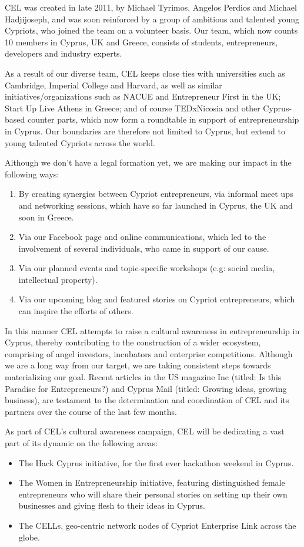 \documentclass[a4paper,11pt]{report}
\begin{document}
CEL was created in late 2011, by Michael Tyrimos, Angelos Perdios and Michael Hadjijoseph, and was soon reinforced by a group of ambitious and talented young Cypriots, who joined the team on a volunteer basis. Our team, which now counts 10 members in Cyprus, UK and Greece, consists of students, entrepreneurs, developers and industry experts. 

As a result of our diverse team, CEL keeps close ties with universities such as Cambridge, Imperial College and Harvard, as well as similar initiatives/organizations such as NACUE and Entrepreneur First in the UK; Start Up Live Athens in Greece; and of course TEDxNicosia and other Cyprus-based counter parts, which now form a roundtable in support of entrepreneurship in Cyprus. Our boundaries are therefore not limited to Cyprus, but extend to young talented Cypriots across the world.

Although we don’t have a legal formation yet, we are making our impact in the following ways:
\begin{enumerate}
  \item By creating synergies between Cypriot entrepreneurs, via informal meet ups and networking sessions, which have so far launched in Cyprus, the UK and soon in Greece. 
  \item Via our Facebook page and online communications, which led to the involvement of several individuals, who came in support of our cause.
  \item Via our planned events and topic-specific workshops (e.g: social media, intellectual property).
  \item Via our upcoming blog and featured stories on Cypriot entrepreneurs, which can inspire the efforts of others. 
\end{enumerate}

In this manner CEL attempts to raise a cultural awareness in entrepreneurship in Cyprus, thereby contributing to the construction of a wider ecosystem, comprising of angel investors, incubators and enterprise competitions. Although we are a long way from our target, we are taking consistent steps towards materializing our goal. Recent articles in the US magazine Inc (titled: Is this Paradise for Entrepreneurs?) and Cyprus Mail (titled: Growing ideas, growing business), are testament to the determination and coordination of CEL and its partners over the course of the last few months.

As part of CEL’s cultural awareness campaign, CEL will be dedicating a vast part of its dynamic on the following areas:
\begin{itemize}
  \item The Hack Cyprus initiative, for the first ever hackathon weekend in Cyprus.
  \item The Women in Entrepreneurship initiative, featuring distinguished female entrepreneurs who will share their personal stories on setting up their own businesses and giving flesh to their ideas in Cyprus.
  \item The CELLs, geo-centric network nodes of Cypriot Enterprise Link across the globe. 
\end{itemize}
\end{document}
